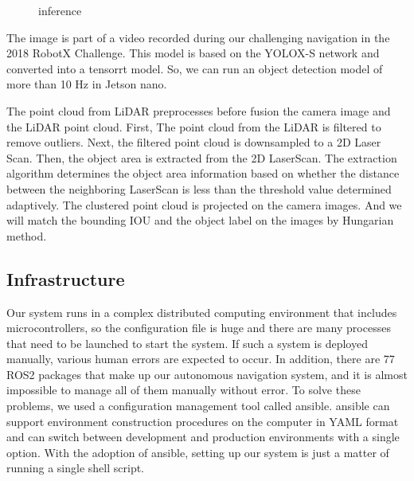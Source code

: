\documentclass[lettersize,journal]{IEEEtran}
\begin{document}
\begin{figure}[h]
    \begin{center}
  \end{center}
  \caption{inference}
  \label{fig:inference}
\end{figure}

The image is part of a video recorded during our challenging navigation in the 2018 RobotX Challenge.\cite{RobotX2018_video}
This model is based on the YOLOX-S network and converted into a tensorrt model.
So, we can run an object detection model of more than 10 Hz in Jetson nano.

\indent The point cloud from LiDAR preprocesses before fusion the camera image and the LiDAR point cloud.
First, The point cloud from the LiDAR is filtered to remove outliers.
Next, the filtered point cloud is downsampled to a 2D Laser Scan.
Then, the object area is extracted from the 2D LaserScan. \cite{scan_segmentation}
The extraction algorithm determines the object area information based on whether the distance between 
the neighboring LaserScan is less than the threshold value determined adaptively.
The clustered point cloud is projected on the camera images.
And we will match the bounding IOU and the object label on the images by Hungarian method.

\subsection{Infrastructure}
Our system runs in a complex distributed computing environment that includes microcontrollers,
so the configuration file is huge and there are many processes that need to be launched to start the system.
If such a system is deployed manually, various human errors are expected to occur.
In addition, there are 77 ROS2 packages that make up our autonomous navigation system,
and it is almost impossible to manage all of them manually without error.
To solve these problems, we used a configuration management tool called ansible.
ansible can support environment construction procedures on the computer in YAML format and
can switch between development and production environments with a single option.
With the adoption of ansible, setting up our system is just a matter of running a single shell script.
\end{document}
